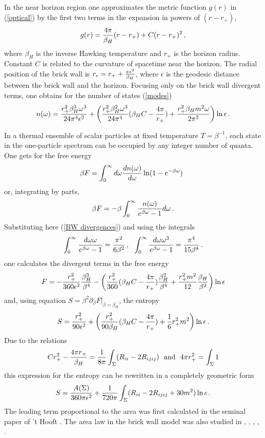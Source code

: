 \documentclass[12pt]{article}
\def\be{\begin{eqnarray}}
\def\ee{\end{eqnarray}}
\def\lb{\label}
\def\o{\over}
\begin{document}
In the near horizon region one approximates the metric function $g(r)$ in (\ref{optical}) by the first two terms in the expansion in powers of $(r-r_+)$,
\be
g(r)={4\pi\o \beta_H}(r-r_+)+C(r-r_+)^2\, ,
\lb{metric function-1}
\ee
where $\beta_H$ is the inverse Hawking temperature and $r_+$ is the horizon radius. Constant $C$ is related to the curvature of spacetime near the horizon. The radial position of the brick wall is $r_\epsilon=r_++{\pi\epsilon^2\o \beta_H}$,
where $\epsilon$ is the geodesic distance between the brick wall and the horizon.
Focusing only on the brick wall divergent terms,  one obtains for the number of states (\ref{modes})
\be
n(\omega)={r_+^2\beta_H^3 \omega^3\o 24\pi^4\epsilon^2}+\left({r_+^2\beta_H^2 \omega^3\o 24\pi^4}(\beta_H C-{4\pi \o r_+})+{r_+^2\beta_H m^2 \omega\o 2\pi^2}\right)\ln\epsilon\, .
\lb{BW divergences}
\ee



In a thermal ensemble of scalar particles at fixed temperature $T=\beta^{-1}$, each state in the one-particle spectrum can be occupied by any integer number of quanta.  
One gets for the free energy
\be
\beta F=\int_{0}^\infty d\omega{dn(\omega)\o d\omega} \ln (1-e^{-\beta \omega})~\, \lb{free energy}
\ee
or, integrating by parts,
\be
\beta F=-\beta \int_{0}^\infty {n(\omega)\o e^{\beta \omega}-1} d\omega\, .
\lb{free energy-2}
\ee
Substituting here (\ref{BW divergences}) and using the integrals
\be
\int_0^\infty {d\omega\omega\o e^{\beta \omega}-1}={\pi^2\o 6\beta^2}\, , \ \ \int_0^\infty {d\omega\omega^3\o e^{\beta \omega}-1}={\pi^4\o 15\beta^4}\, .
\lb{integrals}
\ee
one calculates the divergent terms in the free energy
\be
F=-{r_+^2\o 360 \epsilon^2}{\beta^3_H\o \beta^4}-\left({r_+^2\o 360}(\beta_H C-{4\pi\o r_+}){\beta_H^2\o \beta^4}+{r_+^2 m^2\o 12}{\beta_H\o \beta^2}\right)\ln\epsilon
\lb{BW free energy}
\ee
and,  using equation $S=\beta^2\partial_\beta F|_{\beta=\beta_H}$, the entropy
\be
S={r_+^2\o 90\epsilon^2}+\left( {r_+^2\o 90\beta_H}(\beta_H C-{4\pi \o r_+})+{1\o 6}r_+^2 m^2\right) \ln\epsilon\, .
\lb{BW entropy}
\ee
Due to the relations 
\be
Cr^2_+-{4\pi r_+\o \beta_H}={1\o 8\pi}\int_\Sigma (R_{ii}-2R_{ijij})\ \ {\rm and} \ \ 4\pi r_+^2=\int_\Sigma 1
\lb{horizon relations}
\ee
this expression for the entropy can be rewritten in a completely geometric form
\be
S={A(\Sigma)\o 360\pi \epsilon^2}+{1\o 720\pi}\int_\Sigma (R_{ii}-2R_{ijij}+30 m^2)\ln\epsilon\, .
\lb{BW entropy 2}
\ee
The leading term proportional to the area was first calculated in the seminal paper of  't Hooft \cite{'tHooft:1984re}. The area law in the brick wall model was also  studied in
\cite{Mann:1990fk},  \cite{Susskind:1994sm},  \cite{Barbon:1994ej}, \cite{Barbon:1994wa}, \cite{Mukohyama:1998rf}.
\end{document}
